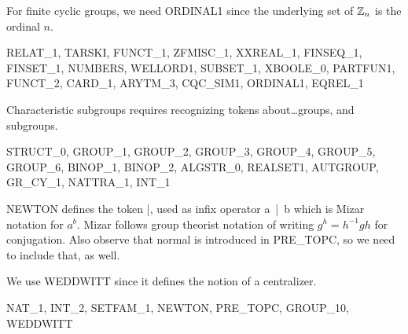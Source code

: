 For finite cyclic groups, we need {\Tt{}ORDINAL1\nwendquote} since the underlying set
of $\mathbb{Z}_{n}$ is the ordinal $n$.

\nwenddocs{}\endmoddef\nwstartdeflinemarkup{}\nwenddeflinemarkup
RELAT_1, TARSKI, FUNCT_1, ZFMISC_1, XXREAL_1, FINSEQ_1,
FINSET_1, NUMBERS, WELLORD1, SUBSET_1, XBOOLE_0, PARTFUN1,
FUNCT_2, CARD_1, ARYTM_3, CQC_SIM1, ORDINAL1, EQREL_1
\nwendcode{}\nwdocspar

Characteristic subgroups requires recognizing tokens about\dots groups,
and subgroups.

\nwenddocs{}\endmoddef\nwstartdeflinemarkup{}\nwenddeflinemarkup
STRUCT_0, GROUP_1, GROUP_2, GROUP_3, GROUP_4, GROUP_5,
GROUP_6, BINOP_1, BINOP_2, ALGSTR_0, REALSET1, AUTGROUP,
GR_CY_1, NATTRA_1, INT_1
\nwendcode{}\nwdocspar

{\Tt{}NEWTON\nwendquote} defines the token {\Tt{}|{}\nwendquote}, used as infix operator {\Tt{}a\ |{}\ b\nwendquote}
which is Mizar notation for $a^{b}$. Mizar follows group theorist
notation of writing $g^{h} = h^{-1}gh$ for conjugation. Also observe
that {\Tt{}normal\nwendquote} is introduced in {\Tt{}PRE{\_}TOPC\nwendquote}, so we need to include
that, as well.

We use {\Tt{}WEDDWITT\nwendquote} since it defines the notion of a centralizer.

\nwenddocs{}\endmoddef\nwstartdeflinemarkup{}\nwenddeflinemarkup
NAT_1, INT_2, SETFAM_1, NEWTON, PRE_TOPC, GROUP_10, WEDDWITT
\nwendcode{}\nwdocspar

